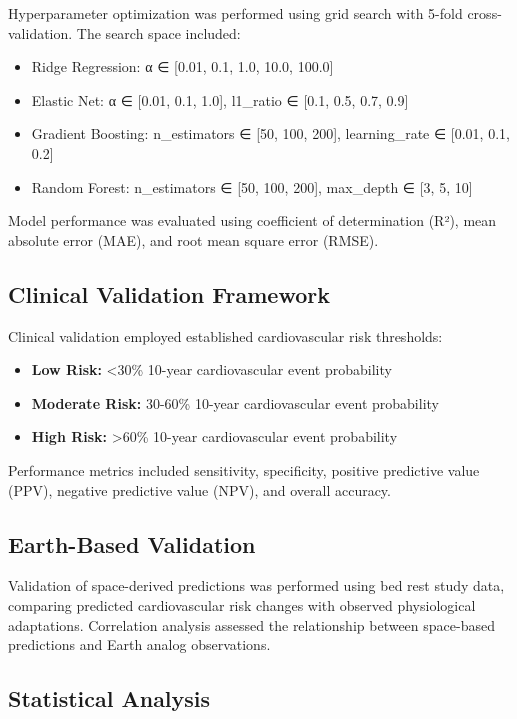 \documentclass[11pt,a4paper]{article}
\begin{document}
Hyperparameter optimization was performed using grid search with 5-fold cross-validation. The search space included:

\begin{itemize}
    \item Ridge Regression: α ∈ [0.01, 0.1, 1.0, 10.0, 100.0]
    \item Elastic Net: α ∈ [0.01, 0.1, 1.0], l1\_ratio ∈ [0.1, 0.5, 0.7, 0.9]
    \item Gradient Boosting: n\_estimators ∈ [50, 100, 200], learning\_rate ∈ [0.01, 0.1, 0.2]
    \item Random Forest: n\_estimators ∈ [50, 100, 200], max\_depth ∈ [3, 5, 10]
\end{itemize}

Model performance was evaluated using coefficient of determination (R²), mean absolute error (MAE), and root mean square error (RMSE).

\subsection{Clinical Validation Framework}

Clinical validation employed established cardiovascular risk thresholds:

\begin{itemize}
    \item \textbf{Low Risk:} <30\% 10-year cardiovascular event probability
    \item \textbf{Moderate Risk:} 30-60\% 10-year cardiovascular event probability  
    \item \textbf{High Risk:} >60\% 10-year cardiovascular event probability
\end{itemize}

Performance metrics included sensitivity, specificity, positive predictive value (PPV), negative predictive value (NPV), and overall accuracy.

\subsection{Earth-Based Validation}

Validation of space-derived predictions was performed using bed rest study data, comparing predicted cardiovascular risk changes with observed physiological adaptations. Correlation analysis assessed the relationship between space-based predictions and Earth analog observations.

\subsection{Statistical Analysis}
\end{document}
